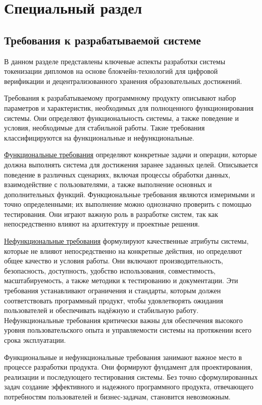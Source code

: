 \section{Специальный раздел}
\label{sec:special}

\subsection{Требования к разрабатываемой системе}

В данном разделе представлены ключевые аспекты разработки системы токенизации дипломов на основе блокчейн-технологий для цифровой верификации и децентрализованного хранения образовательных достижений. 

Требования к разрабатываемому программному продукту описывают набор параметров и характеристик, необходимых для полноценного функционирования системы. Они определяют функциональность системы, а также поведение и условия, необходимые для стабильной работы. Такие требования классифицируются на функциональные и нефункциональные. \cite{bib:func_and_nf_req}

\hyperref[subsec:func_req]{Функциональные требования} определяют конкретные задачи и операции, которые должна выполнять система для достижения заранее заданных целей. Описывается поведение в различных сценариях, включая процессы обработки данных, взаимодействие с пользователями, а также выполнение основных и дополнительных функций. Функциональные требования являются измеримыми и точно определенными; их выполнение можно однозначно проверить с помощью тестирования. Они играют важную роль в разработке систем, так как непосредственно влияют на архитектуру и проектные решения.

\hyperref[subsec:nonfunc_req]{Нефункциональные требования} формулируют качественные атрибуты системы, которые не влияют непосредственно на конкретные действия, но определяют общее качество и условия работы. Они включают производительность, безопасность, доступность, удобство использования, совместимость, масштабируемость, а также методики к тестированию и документации. Эти требования устанавливают ограничения и стандарты, которым должен соответствовать программный продукт, чтобы удовлетворять ожидания пользователей и обеспечивать надёжную и стабильную работу. Нефункциональные требования критически важны для обеспечения высокого уровня пользовательского опыта и управляемости системы на протяжении всего срока эксплуатации.

Функциональные и нефункциональные требования занимают важное место в процессе разработки продукта. Они формируют фундамент для проектирования, реализации и последующего тестирования системы. Без точно сформулированных задач создание эффективного и надежного программного продукта, отвечающего  потребностям пользователей и бизнес-задачам, становится невозможным.~\cite{bib:app_req}

